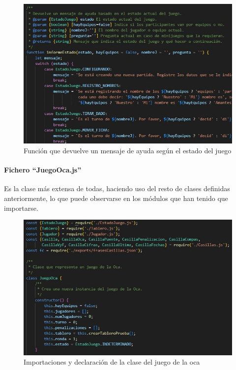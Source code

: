 \begin{figure}[H]
	\centering
	\includegraphics{imgs/codigo-estado-2.jpg}
	\caption{Función que devuelve un mensaje de ayuda según el estado del juego}
	\label{fig:codigo-estado-2}
\end{figure}

\paragraph{Fichero \enquote{JuegoOca.js}}

Es la clase más extensa de todas, haciendo uso del resto de clases definidas anteriormente, lo que puede observarse en los módulos que han tenido que importarse.

\begin{figure}[H]
	\centering
	\includegraphics{imgs/codigo-oca-1.jpg}
	\caption{Importaciones y declaración de la clase del juego de la oca}
	\label{fig:codigo-oca-1}
\end{figure}


